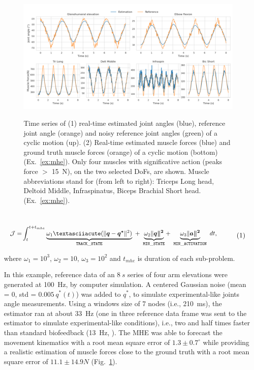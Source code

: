\begin{figure}[t!] 
\centering 
\includegraphics[width=\textwidth]{figures/MHE_results.pdf}\\
\caption{Time series of (1) real-time estimated joint angles (blue), reference joint angle (orange) and noisy reference joint angles (green) of a cyclic motion (up).
(2) Real-time estimated muscle forces (blue) and ground truth muscle forces (orange) of a cyclic motion (bottom) (Ex.~\ref{ex:mhe}).
Only four muscles with significative action (peaks force $>$ 15~N), on the two selected DoFs, are shown.
Muscle abbreviations stand for (from left to right): Triceps Long head, Deltoid Middle, Infraspinatus, Biceps Brachial Short head. (Ex.~\ref{ex:mhe}).} 
\label{fig:MHE_results}
\end{figure} 
\\ 
\[ 
\resizebox{0.9\columnwidth}{!}{$ 
\begin{aligned}
\mathcal{J} = &\int_t^{t+t_{mhe}}\underbrace{\omega_1´(\|\boldsymbol{q} - \boldsymbol{q^*}\|^{2})}_{\mathtt{TRACK\_STATE}}~ 
+ ~ \underbrace{\omega_2\|\boldsymbol{q\|^2}}_{\mathtt{MIN\_STATE}} 
+ ~ \underbrace{\omega_3\|\boldsymbol{a\|^2}}_{\mathtt{MIN\_ACTIVATION}}~dt, 
\end{aligned}   
$}  
\addtag  
\label{eq:ocp_exMHE}  
\]  

\noindent where $\omega_1 =10^3$, $\omega_2 = 10$, $\omega_3 = 10^2$ and $t_{mhe}$ is duration of each sub-problem. 

In this example, reference data of an $8~s$ series of four arm elevations were generated at 100~Hz, by computer simulation.
A centered Gaussian noise (mean = 0, std = $0.005\:q^*(t)$) was added to $q^*$, to simulate experimental-like joints angle measurements.
Using a windows size of 7 nodes (i.e., 210~ms), the estimator ran at about 33~Hz (one in three reference data frame was sent to the estimator to simulate experimental-like conditions), i.e., two and half times faster than standard biofeedback (13~Hz, \cite{kannape2013self}).
The MHE was able to forecast the movement kinematics with a root mean square error of $1.3\pm0.7^{\circ}$ while providing a realistic estimation of muscle forces close to the ground truth with a root mean square error of $11.1\pm14.9N$ (Fig.~\ref{fig:MHE_results}).

